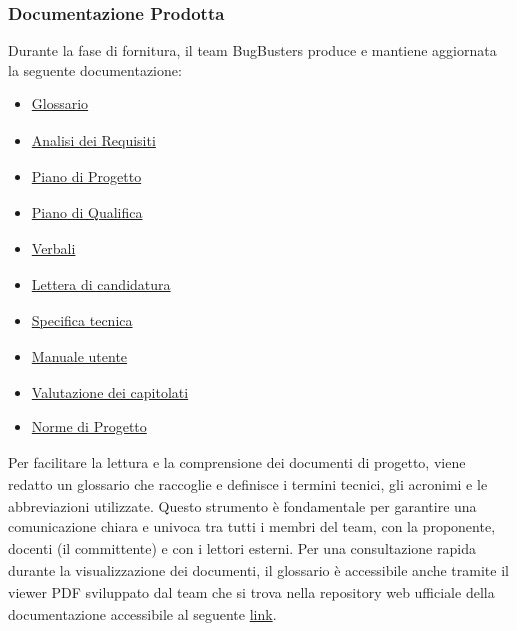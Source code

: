 \documentclass[a4paper,11pt]{article}
\newcommand{\G}{\textsubscript{\scalebox{0.6}{\textbf{G}}}}
\begin{document}
\subsubsection{Documentazione Prodotta}\label{Documentazione Prodotta}
Durante la fase di fornitura, il team BugBusters produce e mantiene aggiornata la seguente documentazione:
\begin{itemize}
    \item \href{https://bugbustersunipd.github.io/DocumentazioneSWE/PB/GLOSSARIO/Glossario.pdf}{Glossario\G{}}
    \item \href{https://bugbustersunipd.github.io/DocumentazioneSWE/PB/ANALISI%20DEI%20REQUISITI/Analisi%20dei%20Requisiti.pdf}{Analisi dei Requisiti\G{}}
    \item \href{https://bugbustersunipd.github.io/DocumentazioneSWE/PB/PIANO%20DI%20PROGETTO/Piano%20di%20progetto.pdf}{Piano di Progetto\G{}}
    \item \href{https://bugbustersunipd.github.io/DocumentazioneSWE/PB/PIANO%20DI%20QUALIFICA/Piano%20di%20Qualifica.pdf}{Piano di Qualifica\G{}}
    \item \href{https://bugbustersunipd.github.io/DocumentazioneSWE/#verbali-pb}{Verbali\G{}}
    \item \href{https://bugbustersunipd.github.io/DocumentazioneSWE/CANDIDATURA/CANDIDATURA%20PROGETTO/Candidatura%20progetto.pdf}{Lettera di candidatura\G{}}
    \item \href{https://bugbustersunipd.github.io/DocumentazioneSWE/PB/SPECIFICA%20TECNICA/Specifica%20Tecnica.pdf}{Specifica tecnica\G{}}
    \item \href{https://bugbustersunipd.github.io/DocumentazioneSWE/PB/MANUALE%20UTENTE/Manuale%20utente.pdf}{Manuale utente\G{}}
    \item \href{https://bugbustersunipd.github.io/DocumentazioneSWE/CANDIDATURA/SCELTA%20CAPITOLATO/Resoconto_capitolati.pdf}{Valutazione dei capitolati}
    \item \href{https://bugbustersunipd.github.io/DocumentazioneSWE/PB/NORME%20DI%20PROGETTO/Norme%20di%20Progetto.pdf}{Norme di Progetto\G{}}
\end{itemize}

\subsubsubsection{Glossario\G{}}
Per facilitare la lettura e la comprensione dei documenti di progetto\G{}, viene redatto un glossario\G{} che raccoglie
e definisce i termini tecnici, gli acronimi e le abbreviazioni utilizzate. Questo strumento è fondamentale per
garantire una comunicazione chiara e univoca tra tutti i membri del team, con la proponente\G{}, docenti (il committente\G{}) e con i lettori esterni.
Per una consultazione rapida durante la visualizzazione dei documenti, il glossario\G{} è accessibile anche tramite il
viewer PDF sviluppato dal team che si trova nella repository\G{} web ufficiale della documentazione accessibile al seguente \href{https://bugbustersunipd.github.io/DocumentazioneSWE/}{link}.
\end{document}

